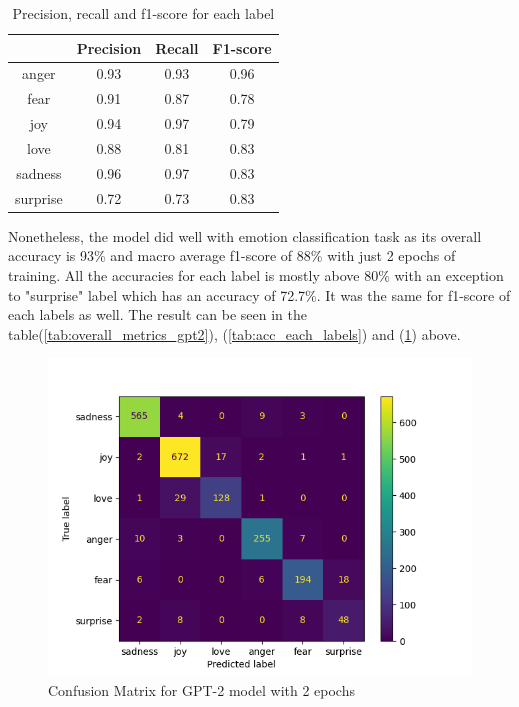 \begin{table}[h!]
    \centering
    \begin{tabular}{c|c|c|c}
         & Precision & Recall & F1-score\\\hline
         anger & 0.93 & 0.93 & 0.96 \\
         fear & 0.91 & 0.87 &  0.78 \\
         joy & 0.94 & 0.97 & 0.79 \\
         love & 0.88 & 0.81 & 0.83\\
         sadness & 0.96 & 0.97 & 0.83\\
         surprise & 0.72 & 0.73 & 0.83\\
    \end{tabular}
    \caption{Precision, recall and f1-score for each label}
    \label{tab:class_rep_gpt2}
\end{table}

Nonetheless, the model did well with emotion classification task as its overall accuracy is 93\% and macro average f1-score of 88\% with just 2 epochs of training. All the accuracies for each label is mostly above 80\% with an exception to "surprise" label which has an accuracy of 72.7\%. It was the same for f1-score of each labels as well. The result can be seen in the table(\ref{tab:overall_metrics_gpt2}), (\ref{tab:acc_each_labels}) and (\ref{tab:class_rep_gpt2}) above.

\begin{figure}[h!]
    \centerline{\includegraphics[scale=0.6]{Figures/conf_metrix_gpt2_2_epochs.png}}
    \caption{Confusion Matrix for GPT-2 model with 2 epochs}
    \label{fig:conf_matrix_gpt2}
\end{figure}


